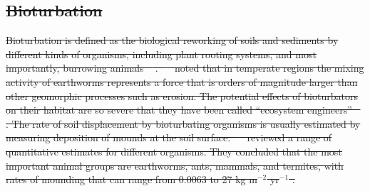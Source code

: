 \documentclass[11pt, oneside, a4paper]{article}   	%
\providecommand{\DIFdeltex}[1]{{\protect\color{red}\sout{#1}}}                      %
\providecommand{\DIFdelend}{} %
\providecommand{\DIFdel}[1]{\texorpdfstring{\DIFdeltex{#1}}{}} %
\DeclareRobustCommand{\DIFdelend}{\DIFOaddend \let\includegraphics\DIFOincludegraphics} %
\begin{document}
\subsection{\DIFdel{Bioturbation}}
\addtocounter{subsection}{-1}%
\DIFdel{Bioturbation is defined as the biological reworking of soils and sediments by different kinds of organisms, including plant rooting systems, and most importantly, burrowing animals \mbox{%
\citep{Meysman2006}}\hskip0pt%
. \mbox{%
\citet{Chapin2002} }\hskip0pt%
noted that in temperate
regions the mixing activity of earthworms represents a force that is orders of magnitude
larger than other geomorphic processes such as erosion. The potential effects of
bioturbators on their habitat are so severe that they have been called “ecosystem
engineers” \mbox{%
\citep{Meysman2006}}\hskip0pt%
.
The rate of soil displacement by bioturbating organisms is usually estimated by
measuring deposition of mounds at the soil surface. \mbox{%
\citet{Paton1995} }\hskip0pt%
reviewed
a range of quantitative estimates for different organisms. They concluded that the
most important animal groups are earthworms, ants, mammals, and termites, with rates
of mounding that can range from 0.0063 to 27 kg m$^{-2}$ yr$^{-1}$ . 
}\DIFdelend %
\end{document}
